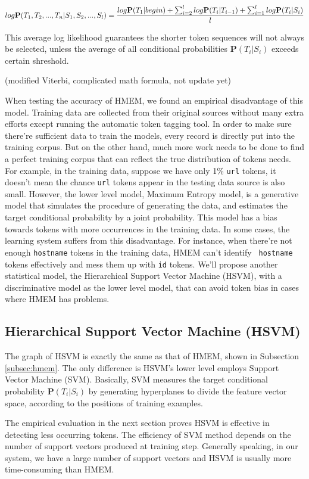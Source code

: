 \begin{equation}
log \mathbf{P}(T_1, T_2, ..., T_n|S_1, S_2, ..., S_l) \\
= \frac{log \mathbf{P}(T_1|begin) +
\sum_{i=2}^{l}log \mathbf{P}(T_i|T_{i-1}) + \sum_{i=1}^{l}log
\mathbf{P}(T_i|S_i)}{l}
\end{equation}

This average log likelihood guarantees the shorter token sequences
will not always be selected, unless the average of all conditional
probabilities $\mathbf{P}(T_i|S_i)$ exceeds certain shreshold.

(modified Viterbi, complicated math formula, not update yet)

When testing the accuracy of HMEM, we found an empirical
disadvantage of this model. Training data are collected from their
original sources without many extra efforts except running the
automatic token tagging tool. In order to make sure there're
sufficient data to train the models, every record is directly put into
the training corpus. But on the other hand, much more work needs to be
done to find a perfect training corpus that can reflect the true
distribution of tokens needs. For example, in the training data,
suppose we have only 1\% {\tt url} tokens, it doesn't mean the
chance {\tt url} tokens appear in the testing data source is also
small. However, the lower level model, Maximum Entropy model, is a
generative model that simulates the procedure of generating the data, and
estimates the target conditional probability by a joint
probability. This model has a bias towards tokens with more
occurrences in the training data. In some cases, the learning system
suffers from this disadvantage. For instance, when there're not enough
{\tt hostname} tokens in the training data, HMEM can't identify {\tt
hostname} tokens effectively and mess them up with {\tt id}
tokens. We'll propose another statistical model, the Hierarchical
Support Vector Machine (HSVM), with a discriminative model as the
lower level model, that can avoid token bias in cases where HMEM has problems. 

\subsection{Hierarchical Support Vector Machine (HSVM)}\label{subsec:hsvm}

The graph of HSVM is exactly the same as that of HMEM, shown in
Subsection \ref{subsec:hmem}. The only difference is HSVM's lower
level employs Support Vector Machine (SVM). Basically, SVM measures the target
conditional probability $\mathbf{P}(T_i|S_i)$ by generating
hyperplanes to divide the feature vector space, according to the
positions of training examples.

The empirical evaluation in the next section proves HSVM is effective
in detecting less occurring tokens. The efficiency of SVM method
depends on the number of support vectors produced at training
step. Generally speaking, in our \learnpads{} system, we have a large
number of support vectors and HSVM is usually more time-consuming than HMEM.
